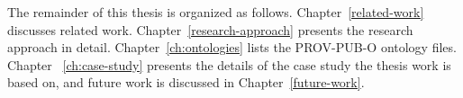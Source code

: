 
The remainder of this thesis is organized as follows. Chapter~\ref{related-work} discusses related work.
Chapter~\ref{research-approach} presents the research approach in detail. 
Chapter~\ref{ch:ontologies} lists the PROV-PUB-O ontology files.
Chapter ~\ref{ch:case-study} presents the details of the case study the thesis work is based on,
and future work is discussed in Chapter~\ref{future-work}.

